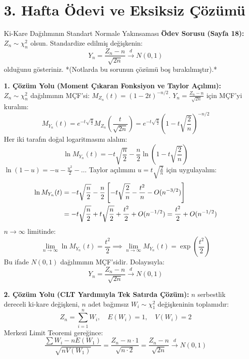 \documentclass[12pt,a4paper]{article}
\begin{document}
\vspace{0.5em}
\section{3. Hafta Ödevi ve Eksiksiz Çözümü}

\begin{odev}{Ki-Kare Dağılımının Standart Normale Yakınsaması}
\textbf{Ödev Sorusu (Sayfa 18):} $Z_n \sim \chi^2_n$ olsun. Standardize edilmiş değişkenin:
\begin{equation}
    Y_n = \frac{Z_n - n}{\sqrt{2n}} \xrightarrow{d} N(0, 1)
\end{equation}
olduğunu gösteriniz. *(Notlarda bu sorunun çözümü boş bırakılmıştır).*

\bigskip
\textbf{1. Çözüm Yolu (Moment Çıkaran Fonksiyon ve Taylor Açılımı):}
$Z_n \sim \chi^2_n$ dağılımının MÇF'si: $M_{Z_n}(t) = (1 - 2t)^{-n/2}$.  
$Y_n = \frac{Z_n - n}{\sqrt{2n}}$ için MÇF'yi kuralım:
\begin{equation}
    M_{Y_n}(t) = e^{-t \sqrt{\frac{n}{2}}} M_{Z_n}\left( \frac{t}{\sqrt{2n}} \right) = e^{-t \sqrt{\frac{n}{2}}} \left( 1 - t \sqrt{\frac{2}{n}} \right)^{-n/2}
\end{equation}
Her iki tarafın doğal logaritmasını alalım:
\begin{equation}
    \ln M_{Y_n}(t) = -t \sqrt{\frac{n}{2}} - \frac{n}{2} \ln\left( 1 - t \sqrt{\frac{2}{n}} \right)
\end{equation}
$\ln(1 - u) = -u - \frac{u^2}{2} - \dots$ Taylor açılımını $u = t \sqrt{\frac{2}{n}}$ için uygulayalım:
\begin{align}
    \ln M_{Y_n}(t) &= -t \sqrt{\frac{n}{2}} - \frac{n}{2} \left[ -t \sqrt{\frac{2}{n}} - \frac{t^2}{n} - O(n^{-3/2}) \right] \notag \\
    &= -t \sqrt{\frac{n}{2}} + t \sqrt{\frac{n}{2}} + \frac{t^2}{2} + O(n^{-1/2}) = \frac{t^2}{2} + O(n^{-1/2})
\end{align}
$n \to \infty$ limitinde:
\begin{equation}
    \lim_{n \to \infty} \ln M_{Y_n}(t) = \frac{t^2}{2} \implies \lim_{n \to \infty} M_{Y_n}(t) = \exp\left( \frac{t^2}{2} \right)
\end{equation}
Bu ifade $N(0, 1)$ dağılımının MÇF'sidir. Dolayısıyla:
\begin{equation}
    \boxed{Y_n = \frac{Z_n - n}{\sqrt{2n}} \xrightarrow{d} N(0, 1)}
\end{equation}

\bigskip
\textbf{2. Çözüm Yolu (CLT Yardımıyla Tek Satırda Çözüm):}
$n$ serbestlik dereceli ki-kare değişkeni, $n$ adet bağımsız $W_i \sim \chi^2_1$ değişkeninin toplamıdır:
\begin{equation}
    Z_n = \sum_{i=1}^n W_i, \quad E(W_i) = 1, \quad V(W_i) = 2
\end{equation}
Merkezi Limit Teoremi gereğince:
\begin{equation}
    \frac{\sum W_i - n E(W_1)}{\sqrt{n V(W_1)}} = \frac{Z_n - n \cdot 1}{\sqrt{n \cdot 2}} = \boxed{\frac{Z_n - n}{\sqrt{2n}} \xrightarrow{d} N(0, 1)}
\end{equation}
\end{odev}
\end{document}
